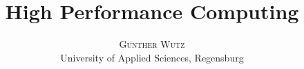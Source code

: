 \documentclass[a4paper, 10pt, DIV12, twoside]{scrartcl}
\title{\vspace{-15mm}%
	\fontsize{24pt}{10pt}\selectfont
	\textbf{High Performance Computing}
	}
\author{%
	\large
	\textsc{Günther Wutz} \\[2mm]
	\normalsize	University of Applied Sciences, Regensburg\\
	\vspace{-5mm}
	}
\date{}
\begin{document}
\maketitle
\newpage
\twocolumn
    


\end{document}
